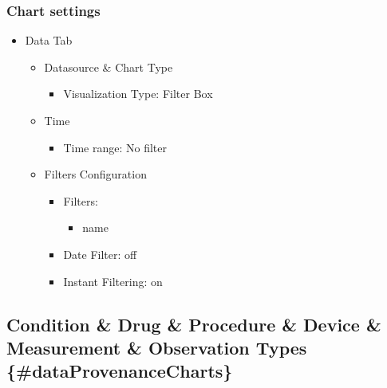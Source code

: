 \documentclass[
]{book}
\providecommand{\tightlist}{%
  \setlength{\itemsep}{0pt}\setlength{\parskip}{0pt}}
\begin{document}
\hypertarget{chart-settings-25}{%
\subsubsection*{Chart settings}\label{chart-settings-25}}

\begin{itemize}
\tightlist
\item
  Data Tab

  \begin{itemize}
  \tightlist
  \item
    Datasource \& Chart Type

    \begin{itemize}
    \tightlist
    \item
      Visualization Type: Filter Box
    \end{itemize}
  \item
    Time

    \begin{itemize}
    \tightlist
    \item
      Time range: No filter
    \end{itemize}
  \item
    Filters Configuration

    \begin{itemize}
    \tightlist
    \item
      Filters:

      \begin{itemize}
      \tightlist
      \item
        name
      \end{itemize}
    \item
      Date Filter: off
    \item
      Instant Filtering: on
    \end{itemize}
  \end{itemize}
\end{itemize}

\hypertarget{condition-drug-procedure-device-measurement-observation-types-dataprovenancecharts}{%
\subsection*{Condition \& Drug \& Procedure \& Device \& Measurement \& Observation Types \{\#dataProvenanceCharts\}}\label{condition-drug-procedure-device-measurement-observation-types-dataprovenancecharts}}
\end{document}
